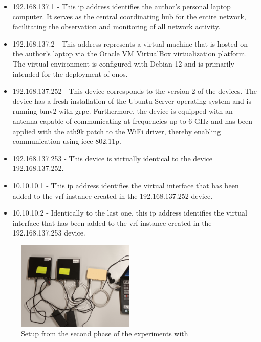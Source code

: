 \begin{itemize}
	\item 192.168.137.1 - This \gls{ip} address identifies the author's personal laptop computer. It serves as the central coordinating hub for the entire network, facilitating the observation and monitoring of all network activity.
	\item 192.168.137.2 - This address represents a virtual machine that is hosted on the author's laptop via the Oracle VM VirtualBox virtualization platform. The virtual environment is configured with Debian 12 and is primarily intended for the deployment of \gls{onos}.
	\item 192.168.137.252 - This device corresponds to the version 2 of the devices. The device has a fresh installation of the Ubuntu Server operating system and is running \gls{bmv2} with grpc. Furthermore, the device is equipped with an antenna capable of communicating at frequencies up to 6 GHz and has been applied with the ath9k patch to the WiFi driver, thereby enabling communication using \gls{ieee} 802.11p.
	\item 192.168.137.253 - This device is virtually identical to the device 192.168.137.252.
	\item 10.10.10.1 - This \gls{ip} address identifies the virtual interface that has been added to the \gls{vrf} instance created in the 192.168.137.252 device.
	\item 10.10.10.2 - Identically to the last one, this \gls{ip} address identifies the virtual interface that has been added to the \gls{vrf} instance created in the 192.168.137.253 device.
\end{itemize}

\begin{figure}
	\centering
	\includegraphics[width=0.5\textwidth]{Chapters/Figures/tests/bmv2_phase_2/20241122_193213.jpg}
	\caption{Setup from the second phase of the experiments with }
	\label{fig:exp2_phase2_setup}
\end{figure}

